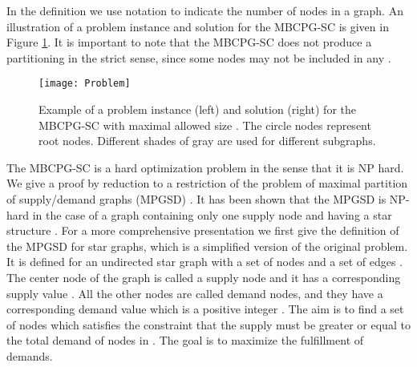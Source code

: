 In the definition we use notation  to indicate the number of nodes in a graph. An illustration of a problem instance and solution for the MBCPG-SC is given in Figure \ref{fig:ProblemColor}. It is important to note that the MBCPG-SC does not produce a partitioning in the strict sense, since some nodes may not be included in any .

\begin{figure}[tcb]
\centering
\texttt{[image: Problem]}
\caption{Example of a problem instance (left) and solution (right) for the MBCPG-SC with maximal allowed size . The circle nodes represent root nodes.  Different shades of gray  are used for different subgraphs.}
\label{fig:ProblemColor}
\end{figure} 

The MBCPG-SC is a hard optimization problem in the sense that it is NP hard. We give a proof by reduction to a restriction of the problem of maximal partition of supply/demand graphs (MPGSD) \citep{Ito2008627}.  It has been shown that the MPGSD is NP-hard  in the case of a graph containing  only one supply node and having a star structure \citep{Ito2008627}.
For a more comprehensive presentation  we first give the definition of the MPGSD for star graphs, which is a simplified version of the original problem. It is defined for an undirected  star graph   with a set of nodes  and a set of edges . The center node of the graph  is called a supply node and it has a corresponding supply value . All the other nodes   are  called demand nodes, and they have a corresponding  demand value  which is a positive integer  .   The aim is to find a set of nodes   which satisfies the constraint that  the supply  must be greater or equal  to the total demand of nodes in . The goal is to maximize the fulfillment of demands.



